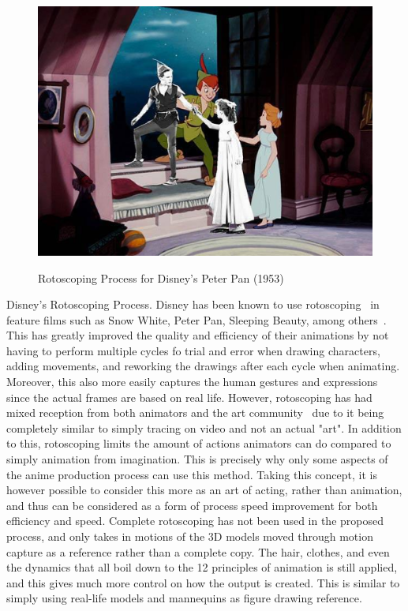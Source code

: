\begin{figure}[t]
    \centering
    \includegraphics[width=1\linewidth]{img/relatedwork/disney_rotoscope.pdf} \\
    \caption{Rotoscoping Process for Disney's Peter Pan (1953)~\cite{peterPanRotoscoping}}
    \vspace{-15pt}
    \label{fig:disney_rotoscope}
\end{figure}

Disney's Rotoscoping Process. Disney has been known to use rotoscoping~\cite{rotoscoping} in feature films such as Snow White, Peter Pan, Sleeping Beauty, among others~\cite{rotoscopingInDisney}. This has greatly improved the quality and efficiency of their animations by not having to perform multiple cycles fo trial and error when drawing characters, adding movements, and reworking the drawings after each cycle when animating. Moreover, this also more easily captures the human gestures and expressions since the actual frames are based on real life. However, rotoscoping has had mixed reception from both animators and the art community~\cite{horrorsOfRotoscoping, tvTropesRotoscoping} due to it being completely similar to simply tracing on video and not an actual "art". In addition to this, rotoscoping limits the amount of actions animators can do compared to simply animation from imagination. This is precisely why only some aspects of the anime production process can use this method. Taking this concept, it is however possible to consider this more as an art of acting, rather than animation, and thus can be considered as a form of process speed improvement for both efficiency and speed. Complete rotoscoping has not been used in the proposed process, and only takes in motions of the 3D models moved through motion capture as a reference rather than a complete copy. The hair, clothes, and even the dynamics that all boil down to the 12 principles of animation is still applied, and this gives much more control on how the output is created. This is similar to simply using real-life models and mannequins as figure drawing reference.